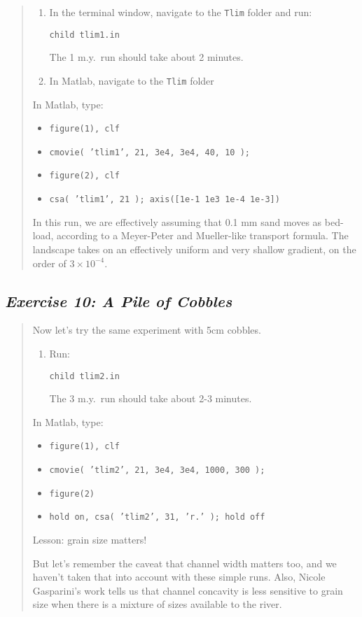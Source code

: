\documentclass[12pt,reqno]{amsart}
\begin{document}
\begin{quote}
\small
{\sf
\begin{enumerate}
\item
In the terminal window, navigate to the {\tt Tlim} folder and run:

{\tt child tlim1.in}

The 1 m.y.\ run should take about 2 minutes.
\item
In Matlab, navigate to the {\tt Tlim} folder
\end{enumerate}

\noindent
In Matlab, type:
\begin{itemize}
\setcounter{enumi}{2}
\item
{\tt figure(1), clf}
\item
{\tt cmovie( 'tlim1', 21, 3e4, 3e4, 40, 10 );}
\item
{\tt figure(2), clf}
\item
{\tt csa( 'tlim1', 21 ); axis([1e-1 1e3 1e-4 1e-3])}
\end{itemize}

\noindent
In this run, we are effectively assuming that 0.1 mm sand moves as bed-load, according to a Meyer-Peter and Mueller-like transport formula. The landscape takes on an effectively uniform and very shallow gradient, on the order of $3\times 10^{-4}$.
}
\end{quote}

\subsection*{\em Exercise 10: A Pile of Cobbles}

\begin{quote}
\small
{\sf
Now let's try the same experiment with 5cm cobbles.

\begin{enumerate}
\item
Run:

{\tt child tlim2.in}

The 3 m.y.\ run should take about 2-3 minutes.
\end{enumerate}

\noindent
In Matlab, type:
\begin{itemize}
\setcounter{enumi}{1}
\item
{\tt figure(1), clf}
\item
{\tt cmovie( 'tlim2', 21, 3e4, 3e4, 1000, 300 );}
\item
{\tt figure(2)}
\item
{\tt hold on, csa( 'tlim2', 31, 'r.' ); hold off}
\end{itemize}

Lesson: grain size matters! 

But let's remember the caveat that channel width matters too, and we
haven't taken that into account with these simple runs. Also, Nicole
Gasparini's work \citep{gasparini1999downstream,gasparini2004network}
tells us that channel concavity is less sensitive to grain size when
there is a mixture of sizes available to the river.
}
\end{quote}
\end{document}
